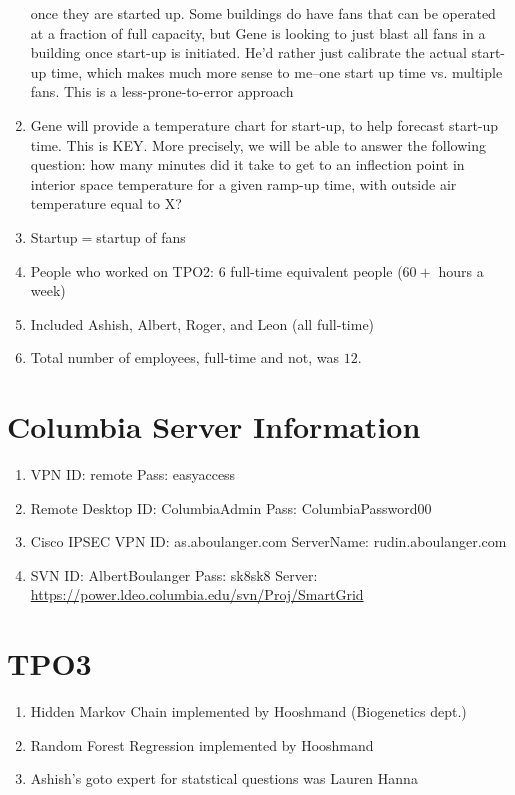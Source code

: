 \documentclass[12pt,a4paper]{article}
\begin{document}
\begin{enumerate}
	once they are started up. Some buildings do have fans that can be operated 
	at a fraction of full capacity, but Gene is looking to just blast all fans
	in a building once start-up is initiated. He'd rather just calibrate
	the actual start-up time, which makes much more sense to me--one start up 
	time vs. multiple fans. This is a less-prone-to-error approach
	\item Gene will provide a temperature chart for start-up, to help forecast 
	start-up time. This is KEY. More precisely, we will be able to answer the 
	following question: how many minutes did it take to get to an inflection 
	point in interior space temperature for a given ramp-up time, with outside 
	air temperature equal to X?
	\item Startup$=$startup of fans
	\item People who worked on TPO2: 6 full-time equivalent people ($60+$ hours 
	a week)
	\item Included Ashish, Albert, Roger, and Leon (all full-time)
	\item Total number of employees, full-time and not, was $12$.
\end{enumerate}
\section{Columbia Server Information}
\begin{enumerate}
	\item{VPN} ID: remote Pass: easyaccess
	\item{Remote Desktop} ID: ColumbiaAdmin Pass: ColumbiaPassword00
	\item{Cisco IPSEC VPN} ID: as.aboulanger.com 
	ServerName:	rudin.aboulanger.com
	\item{SVN} ID: AlbertBoulanger Pass: sk8sk8 Server: 
	\url{https://power.ldeo.columbia.edu/svn/Proj/SmartGrid}
\end{enumerate}
\section{TPO3}
\begin{enumerate}
	\item Hidden Markov Chain implemented by Hooshmand (Biogenetics dept.)
	\item Random Forest Regression implemented by Hooshmand
	\item Ashish's goto expert for statstical questions was Lauren Hanna	
\end{enumerate}
\end{document}
